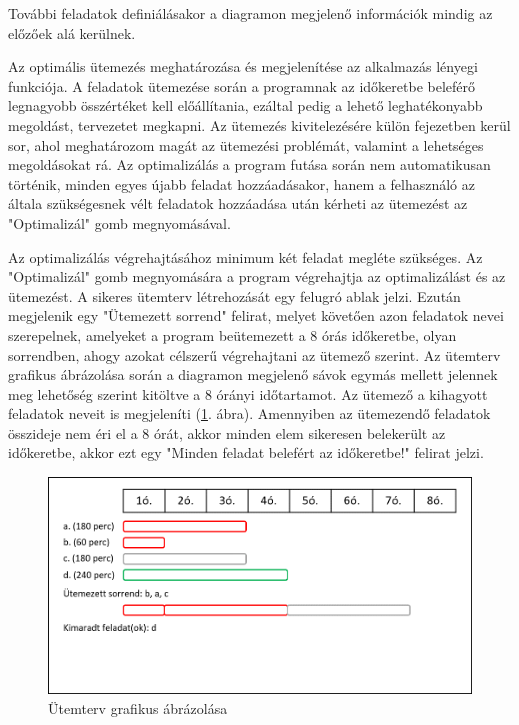 További feladatok definiálásakor a diagramon megjelenő információk mindig az előzőek alá kerülnek.


Az optimális ütemezés meghatározása és megjelenítése az alkalmazás lényegi funkciója. A feladatok ütemezése során a programnak az időkeretbe beleférő legnagyobb összértéket kell előállítania, ezáltal pedig a lehető leghatékonyabb megoldást, tervezetet megkapni. Az ütemezés kivitelezésére külön fejezetben kerül sor, ahol meghatározom magát az ütemezési problémát, valamint a lehetséges megoldásokat rá. Az optimalizálás a program futása során nem automatikusan történik, minden egyes újabb feladat hozzáadásakor, hanem a felhasználó az általa szükségesnek vélt feladatok hozzáadása után kérheti az ütemezést az "Optimalizál" gomb megnyomásával.

Az optimalizálás végrehajtásához minimum két feladat megléte szükséges. Az "Optimalizál" gomb megnyomására a program végrehajtja az optimalizálást és az ütemezést. A sikeres ütemterv létrehozását egy felugró ablak jelzi. Ezután megjelenik egy "Ütemezett sorrend" felirat, melyet követően azon feladatok nevei szerepelnek, amelyeket a program beütemezett a 8 órás időkeretbe, olyan sorrendben, ahogy azokat célszerű végrehajtani az ütemező szerint. Az ütemterv grafikus ábrázolása során a diagramon megjelenő sávok egymás mellett jelennek meg lehetőség szerint kitöltve a 8 órányi időtartamot. Az ütemező a kihagyott feladatok neveit is megjeleníti (\ref{fig:scheduledTasks}. ábra). Amennyiben az ütemezendő feladatok összideje nem éri el a 8 órát, akkor minden elem sikeresen belekerült az időkeretbe, akkor ezt egy "Minden feladat belefért az időkeretbe!" felirat jelzi.

\begin{figure}[h]
	\centering
	\includegraphics[scale=0.8]{images/scheduledTasks.png}
	\caption{Ütemterv grafikus ábrázolása}
	\label{fig:scheduledTasks}
\end{figure}
